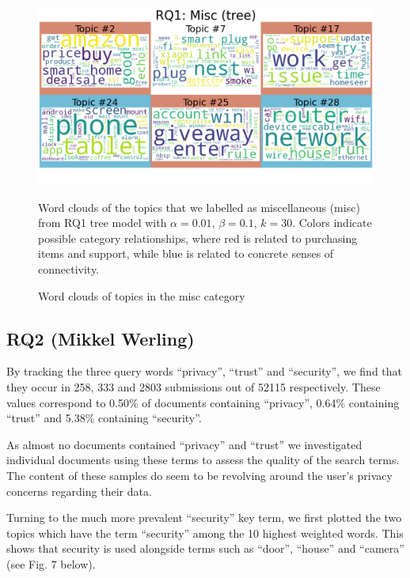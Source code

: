 \documentclass{article}
\begin{document}
\begin{figure}[H]
    \begin{centering}
    \includegraphics[width = \textwidth]{../Figure/tree_misc_red.png}
    \caption{Word clouds of topics in the misc category}
    \end{centering}
    \begin{footnotesize} 
        Word clouds of the topics that we labelled as miscellaneous (misc) from RQ1 tree model with $\alpha = 0.01$, $\beta = 0.1$, $k = 30$. Colors indicate possible category relationships, where red is related to purchasing items and support, while blue is related to concrete senses of connectivity. 
    \end{footnotesize}
\end{figure}

    \subsection{RQ2 (Mikkel Werling)}
    By tracking the three query words “privacy”, “trust” and “security”, we find that they occur in 258, 333 and 2803 submissions out of 52115 respectively. These values correspond to 0.50\% of documents containing “privacy”, 0.64\% containing “trust” and 5.38\% containing “security”. 

    As almost no documents contained “privacy” and “trust” we investigated individual documents using these terms to assess the quality of the search terms. The content of these samples do seem to be revolving around the user’s privacy concerns regarding their data.
    
    Turning to the much more prevalent “security” key term, we first plotted the two topics which have the term “security” among the 10 highest weighted words. This shows that security is used alongside terms such as “door”, “house” and “camera” (see Fig. 7 below).
    
\end{document}
